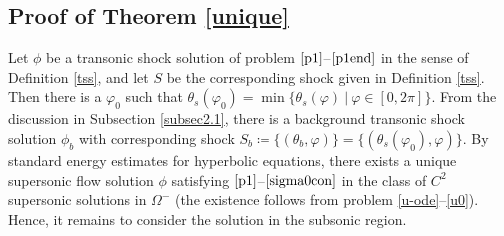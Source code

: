 \documentclass[10pt,a4paper]{amsart}
\numberwithin{equation}{section}
\begin{document}
\subsection{Proof of Theorem \ref{unique}}\label{subsec2.2}
Let $\phi$ be a transonic shock solution of problem $\eqref{p1}$--$\eqref{p1end}$ in the sense of Definition \ref{tss}, and let $S$ be the corresponding shock given in Definition \ref{tss}. Then there is a  $\varphi_0$ such that $\theta_s(\varphi_0)=\min\{\theta_s(\varphi)~|~\varphi\in[0,2\pi]\}$. From the discussion in Subsection \ref{subsec2.1}, there is a  background transonic shock solution $\phi_b$ with corresponding shock $S_b\coloneqq\{(\theta_{b},\varphi)\}=\{(\theta_{s}(\varphi_0),\varphi)\}$. By standard energy estimates  for hyperbolic equations, there exists a unique supersonic flow solution $\phi$ satisfying $\eqref{p1}$--$\eqref{sigma0con}$ in the class of $C^2$ supersonic solutions in $\Omega^-$ (the existence follows from problem \eqref{u-ode}--\eqref{u0}). Hence, it remains to consider the solution in the subsonic region.
\end{document}
